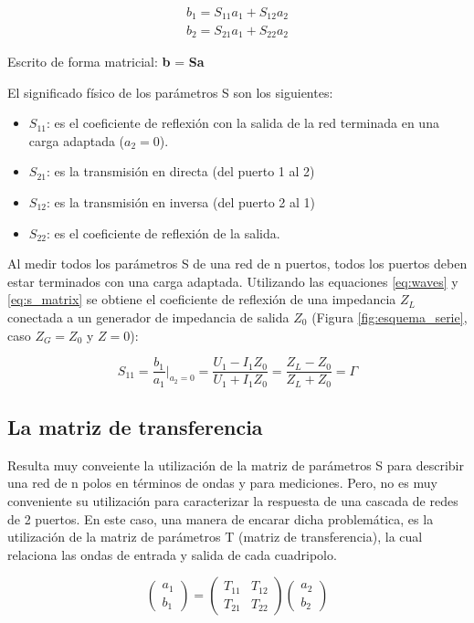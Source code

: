 \begin{equation}
\begin{aligned}
	b_1 = S_{11}a_1 + S_{12}a_2 \\
	b_2 = S_{21}a_1 + S_{22}a_2
\end{aligned}
\label{eq:s_matrix}
\end{equation}
	
Escrito de forma matricial: \textbf{b} = \textbf{Sa}

El significado físico de los parámetros S son los siguientes:
\begin{itemize}
	\item $S_{11}$: es el coeficiente de reflexión con la salida de la red terminada en una carga adaptada ($a_2 = 0$).
	\item $S_{21}$: es la transmisión en directa (del puerto 1 al 2)
	\item $S_{12}$: es la transmisión en inversa (del puerto 2 al 1)
	\item $S_{22}$: es el coeficiente de reflexión de la salida. 
\end{itemize}

Al medir todos los parámetros S de una red de n puertos, todos los puertos deben estar terminados con una carga adaptada.
Utilizando las equaciones \ref{eq:waves} y \ref{eq:s_matrix} se obtiene el coeficiente de reflexión de una impedancia $Z_L$
conectada a un generador de impedancia de salida $Z_0$ (Figura \ref{fig:esquema_serie}, caso $Z_G = Z_0$ y $Z = 0$):

\begin{equation}
S_{11} = \dfrac{b_1}{a_1}\bigg|_{a_2=0} = \dfrac{U_1 - I_1Z_0}{U_1 + I_1Z_0} = \dfrac{Z_L - Z_0}{Z_L + Z_0} = \Gamma 
\end{equation}

\subsection{La matriz de transferencia}

Resulta muy conveiente la utilización de la matriz de parámetros S para describir una red de n polos en términos de ondas y 
para mediciones. Pero, no es muy conveniente su utilización para caracterizar la respuesta de una cascada de redes de 2 
puertos. En este caso, una manera de encarar dicha problemática, es la utilización de la matriz de parámetros T (matriz 
de transferencia), la cual relaciona las ondas de entrada y salida de cada cuadripolo.

\begin{equation}
\begin{pmatrix} a_1\\b_1 \end{pmatrix} = \begin{pmatrix} T_{11} & T_{12}\\T_{21} & T_{22} \end{pmatrix} 
\begin{pmatrix} a_2\\b_2 \end{pmatrix}
\end{equation}

